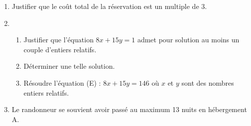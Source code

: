 \documentclass{cornouaille}
\begin{document}
\begin{exercice}
\begin{enumerate}
\begin{enumerate}
\begin{center}
\end{center}
%
		
	\end{enumerate}
\item Justifier que le coût total de la réservation est un multiple de 3.
\item 
	\begin{enumerate}
	\item Justifier que l'équation $8x + 15y = 1$ admet pour solution au moins un couple d'entiers relatifs.
	\item Déterminer une telle solution.
	\item Résoudre l'équation (E) : $8x + 15y = 146$ où $x$ et $y$ sont des nombres entiers relatifs.
	\end{enumerate}
\item Le randonneur se souvient avoir passé au maximum 13 nuits en hébergement A.


\end{enumerate}
\end{exercice}
\end{document}
